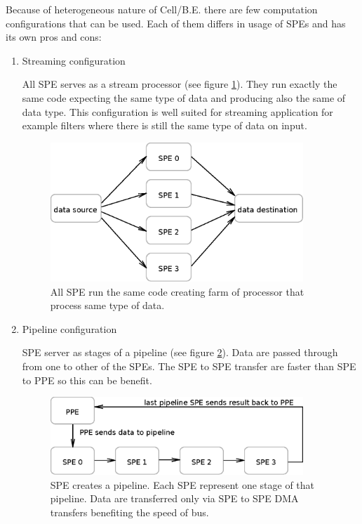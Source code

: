\par
Because of heterogeneous nature of Cell/B.E. there are few computation configurations that can be used.
Each of them differs in usage of SPEs and has its own pros and cons:
\begin{enumerate}
\item Streaming configuration
\par
All SPE serves as a stream processor (see figure \ref{fg:streamingModel}).
They run exactly the same code expecting the same type of data and producing also the same of data type.
This configuration is well suited for streaming application for example filters where there is still the same type of data on input.

\begin{figure}
    \centering
    \includegraphics[width=0.9\textwidth]{data/streamingModel}
    \caption[Streaming SPE configuration]{All SPE run the same code creating farm of processor that process same type of data.}
    \label{fg:streamingModel}
\end{figure}

\item Pipeline configuration
\par
SPE server as stages of a pipeline (see figure \ref{fg:pipelineModel}).
Data are passed through from one to other of the SPEs.
The SPE to SPE transfer are faster than SPE to PPE so this can be benefit.

\begin{figure}
    \centering
    \includegraphics[width=0.9\textwidth]{data/pipelineModel}
    \caption[Pipeline SPE configuration]{SPE creates a pipeline. Each SPE represent one stage of that pipeline. Data are transferred only via SPE to SPE DMA transfers benefiting the speed of bus.}
    \label{fg:pipelineModel}
\end{figure}


\end{enumerate}
